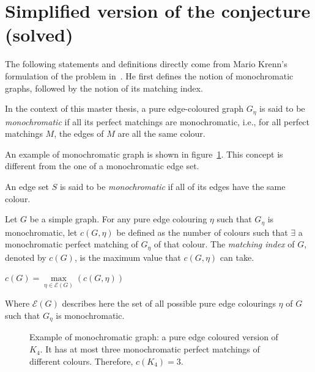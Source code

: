 \section{Simplified version of the conjecture (solved)}
\label{sec:simplified-version-of-the-conjecture}

The following statements and definitions directly come from Mario Krenn's formulation of the problem in~\cite{wordpress}.
He first defines the notion of monochromatic graphs, followed by the notion of its matching index.

\begin{definition}
    \label{def:monochromatic_graph}
    In the context of this master thesis, a pure edge-coloured graph $G_\eta$ is said to be \textit{monochromatic} if all its perfect matchings are monochromatic, i.e., for all perfect matchings $M$, the edges of $M$ are all the same colour.
\end{definition}

An example of monochromatic graph is shown in figure~\ref{fig:k4_pm}.
This concept is different from the one of a monochromatic edge set.

\begin{definition}
    \label{def:monochromatic_edge_set}
    An edge set $S$ is said to be \textit{monochromatic} if all of its edges have the same colour.
\end{definition}

\begin{definition}
    \label{def:matching_index}
    Let $G$ be a simple graph.
    For any pure edge colouring $\eta$ such that $G_\eta$ is monochromatic, let $c(G, \eta)$ be defined as the number of colours such that $\exists$ a monochromatic perfect matching of $G_\eta$ of that colour.
    The \textit{matching index} of $G$, denoted by $c(G)$, is the maximum value that $c(G, \eta)$ can take.
    \begin{center}
        $c(G) = \max\limits_{\eta \in \mathcal{E}(G)}(c(G, \eta))$
    \end{center}
    Where $\mathcal{E}(G)$ describes here the set of all possible pure edge colourings $\eta$ of $G$ such that $G_\eta$ is monochromatic.
\end{definition}

\begin{figure}[H]
    \caption{Example of monochromatic graph: a pure edge coloured version of $K_4$. It has at most three monochromatic perfect matchings of different colours.
        Therefore, $c(K_4) = 3$.}
    \label{fig:k4_pm}
\end{figure}

